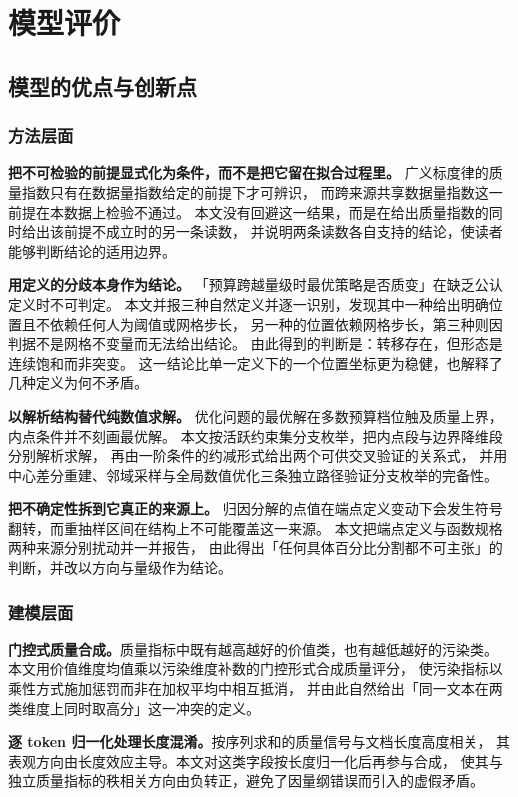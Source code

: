 \section{模型评价}
\label{sec:evaluation}

\subsection{模型的优点与创新点}
\subsubsection{方法层面}
\textbf{把不可检验的前提显式化为条件，而不是把它留在拟合过程里。}
广义标度律的质量指数只有在数据量指数给定的前提下才可辨识，
而跨来源共享数据量指数这一前提在本数据上检验不通过。
本文没有回避这一结果，而是在给出质量指数的同时给出该前提不成立时的另一条读数，
并说明两条读数各自支持的结论，使读者能够判断结论的适用边界。

\textbf{用定义的分歧本身作为结论。}
「预算跨越量级时最优策略是否质变」在缺乏公认定义时不可判定。
本文并报三种自然定义并逐一识别，发现其中一种给出明确位置且不依赖任何人为阈值或网格步长，
另一种的位置依赖网格步长，第三种则因判据不是网格不变量而无法给出结论。
由此得到的判断是：转移存在，但形态是连续饱和而非突变。
这一结论比单一定义下的一个位置坐标更为稳健，也解释了几种定义为何不矛盾。

\textbf{以解析结构替代纯数值求解。}
优化问题的最优解在多数预算档位触及质量上界，内点条件并不刻画最优解。
本文按活跃约束集分支枚举，把内点段与边界降维段分别解析求解，
再由一阶条件的约减形式给出两个可供交叉验证的关系式，
并用中心差分重建、邻域采样与全局数值优化三条独立路径验证分支枚举的完备性。

\textbf{把不确定性拆到它真正的来源上。}
归因分解的点值在端点定义变动下会发生符号翻转，而重抽样区间在结构上不可能覆盖这一来源。
本文把端点定义与函数规格两种来源分别扰动并一并报告，
由此得出「任何具体百分比分割都不可主张」的判断，并改以方向与量级作为结论。

\subsubsection{建模层面}
\textbf{门控式质量合成。}质量指标中既有越高越好的价值类，也有越低越好的污染类。
本文用价值维度均值乘以污染维度补数的门控形式合成质量评分，
使污染指标以乘性方式施加惩罚而非在加权平均中相互抵消，
并由此自然给出「同一文本在两类维度上同时取高分」这一冲突的定义。

\textbf{逐 token 归一化处理长度混淆。}按序列求和的质量信号与文档长度高度相关，
其表观方向由长度效应主导。本文对这类字段按长度归一化后再参与合成，
使其与独立质量指标的秩相关方向由负转正，避免了因量纲错误而引入的虚假矛盾。

